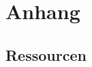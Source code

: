 
\section{Anhang}

\subsection{Ressourcen}
\label{sec:Ressourcen}


\renewcommand{\tabularxcolumn}[1]{>{\centering\arraybackslash}m{#1}}
